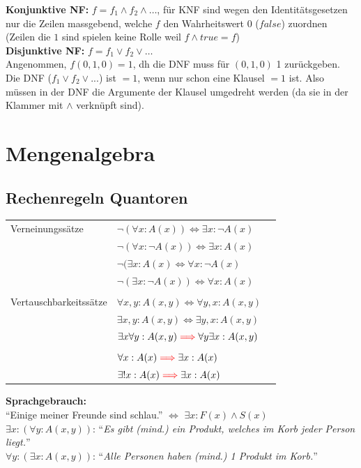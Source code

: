 \documentclass[8pt,landscape]{scrartcl}
\begin{document}
\begin{multicols}{3}
\textbf{Konjunktive NF:} $f = f_1 \land f_2 \land \dots$, f\"ur KNF sind wegen den Identit\"atsgesetzen nur die Zeilen massgebend, welche $f$ den Wahrheitswert 0 ($false$) zuordnen (Zeilen die $1$ sind spielen keine Rolle weil $f \land true = f$)\\

\textbf{Disjunktive NF:} $f = f_1 \lor f_2 \lor \dots$\\
Angenommen, $f(0, 1, 0) = 1$, dh die DNF muss für $(0, 1, 0)$ 1 zurückgeben.
Die DNF ($f_1 \lor f_2 \lor ...$) ist $=1$, wenn nur schon eine Klausel $=1$ ist.
Also m\"ussen in der DNF die Argumente der Klausel umgedreht werden (da sie in der Klammer mit $\land$ verkn\"upft sind).



\section{Mengenalgebra}

\subsection{Rechenregeln Quantoren}
\begin{tabular}{lll}
Verneinungss\"atze     & $\lnot (\forall x : A(x)) \iff \exists x : \lnot A(x) $ & \\
                       & $\lnot (\forall x : \lnot A(x)) \iff \exists x : A(x) $ & \\
                       & $\lnot (\exists x : A(x) \iff \forall x : \lnot A(x) $ & \\
                       & $\lnot (\exists x : \lnot A(x)) \iff \forall x : A(x) $ & \\
& & \\
Vertauschbarkeitss\"atze & $ \forall x, y : A(x, y) \iff \forall y, x : A(x, y) $ & \\
                         & $ \exists x, y : A(x, y) \iff \exists y, x : A(x, y) $ & \\
                         & $ \exists x \forall y : A(x, y) \textcolor{red}{\implies} \forall y \exists x : A(x, y) $ & \\\\
                         & $ \forall x : A(x) \textcolor{red}{\implies} \exists x : A(x) $ & \\
                         & $ \exists ! x : A(x) \textcolor{red}{\implies} \exists x : A(x) $ & \\
\end{tabular}
\textbf{Sprachgebrauch:}\\
``Einige meiner Freunde sind schlau.'' $\iff$ $\exists x : F(x) \land S(x) $\\
$\exists x : (\forall y : A(x, y))$: ``\textit{Es gibt (mind.) ein Produkt, welches im Korb jeder Person liegt.}''\\
$\forall y : (\exists x : A(x, y))$: ``\textit{Alle Personen haben (mind.) 1 Produkt im Korb.}''




\end{multicols}
\end{document}

